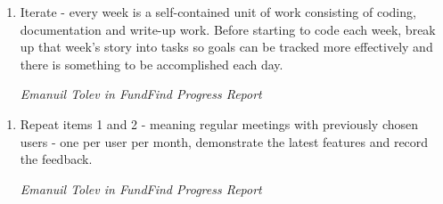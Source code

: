 \begin{shadequote}
\begin{enumerate}
	\setcounter{enumi}{\thetmpc}
	\item Iterate - every week is a self-contained unit of work consisting of coding, documentation and write-up work. Before starting to code each week, break up that week's story into tasks so goals can be tracked more effectively and there is something to be accomplished each day.
	\par\emph{Emanuil Tolev in FundFind Progress Report \cite{progress-report}}
	\setcounter{tmpc}{\theenumi}
\end{enumerate}
\end{shadequote}

\begin{shadequote}
\begin{enumerate}
	\setcounter{enumi}{\thetmpc}
	\item Repeat items 1 and 2 - meaning regular meetings with previously chosen users - one per user per month, demonstrate the latest features and record the feedback.
	\par\emph{Emanuil Tolev in FundFind Progress Report \cite{progress-report}}
	\setcounter{tmpc}{\theenumi}
\end{enumerate}
\end{shadequote}
	


% 
% 


